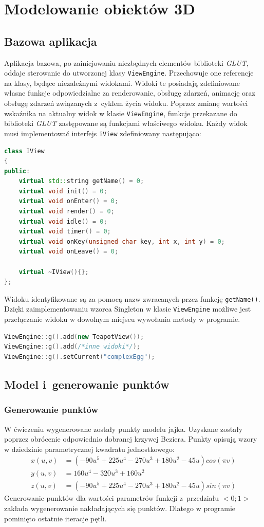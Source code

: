 \newpage
\section{Modelowanie obiektów 3D}
\subsection{Bazowa aplikacja}
Aplikacja bazowa, po zainicjowaniu niezbędnych elementów biblioteki \textit{GLUT}, oddaje sterowanie do utworzonej klasy \lstinline{ViewEngine}. Przechowuje one referencje na klasy, będące niezależnymi widokami. Widoki te posiadają zdefiniowane własne funkcje odpowiedzialne za renderowanie, obsługę zdarzeń, animację oraz obsługę zdarzeń związanych z~cyklem życia widoku. Poprzez zmianę wartości wskaźnika na aktualny widok w klasie \lstinline{ViewEngine}, funkcje przekazane do biblioteki \textit{GLUT} zastępowane są funkcjami właściwego widoku. Każdy widok musi implementować interfejs \lstinline{iView} zdefiniowany następująco:

\begin{lstlisting}[language=C++, caption=Interfejs IView., label={lst:iView}]
class IView
{
public:
    virtual std::string getName() = 0;
    virtual void init() = 0;
    virtual void onEnter() = 0;
    virtual void render() = 0;
    virtual void idle() = 0;
    virtual void timer() = 0;
    virtual void onKey(unsigned char key, int x, int y) = 0;
    virtual void onLeave() = 0;

    virtual ~IView(){};
};
\end{lstlisting}
Widoku identyfikowane są za pomocą nazw zwracanych przez funkcję \lstinline{getName()}.
Dzięki zaimplementowaniu wzorca Singleton w klasie \lstinline{ViewEngine} możliwe jest przełączanie widoku w dowolnym miejscu wywołania metody w programie.
\begin{lstlisting}[language=C++, caption=Tworzeznie instancji widoków i~ustawianie obecnego. Funkcja \lstinline{g} zwraca instancję klasy.]
ViewEngine::g().add(new TeapotView());
ViewEngine::g().add(/*inne widoki*/);
ViewEngine::g().setCurrent("complexEgg");
\end{lstlisting}
\subsection{Model i~generowanie punktów}
\subsubsection{Generowanie punktów}
W ćwiczeniu wygenerowane zostały punkty modelu jajka. Uzyskane zostały poprzez obrócenie odpowiednio dobranej krzywej Beziera. Punkty opisują wzory w dziedzinie parametrycznej kwadratu jednostkowego:
\begin{align*}
    x(u,v)&=(-90u^5+225u^4-270u^3+180u^2-45u)cos(\pi v)\\
    y(u,v)&=160u^4-320u^3+160u^2\\
    z(u,v)&=(-90u^5+225u^4-270u^3+180u^2-45u)sin(\pi v)
\end{align*}
Generowanie punktów dla wartości parametrów funkcji z~przedziału $<0;1>$ zakłada wygenerowanie nakładających się punktów. Dlatego w programie pominięto ostatnie iteracje pętli.
